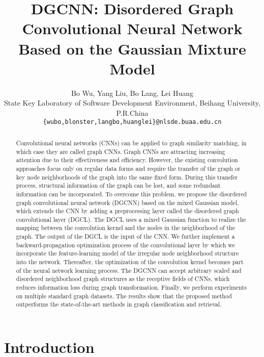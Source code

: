 \documentclass[11pt]{article}
\begin{document}
\title{DGCNN: Disordered Graph Convolutional Neural Network Based on the Gaussian Mixture Model}
\author{
Bo Wu, Yang Liu, Bo Lang, Lei Huang \\
State Key Laboratory of Software Development Environment, Beihang University, P.R.China\\
\texttt{\small\{wubo,blonster,langbo,huanglei\}@nlsde.buaa.edu.cn} \\
}
\date{}
\maketitle
\begin{abstract}
 Convolutional neural networks (CNNs) can be applied to graph similarity matching, in which case they are called graph CNNs. Graph CNNs are attracting increasing attention due to their effectiveness and efficiency. However, the existing convolution approaches focus only on regular data forms and require the transfer of the graph or key node neighborhoods of the graph into the same fixed form. During this transfer process, structural information of the graph can be lost, and some redundant information can be incorporated. To overcome this problem, we propose the disordered graph convolutional neural network (DGCNN) based on the mixed Gaussian model, which extends the CNN by adding a preprocessing layer called the disordered graph convolutional layer (DGCL). The DGCL uses a mixed Gaussian function to realize the mapping between the convolution kernel and the nodes in the neighborhood of the graph. The output of the DGCL is the input of the CNN. We further implement a backward-propagation optimization process of the convolutional layer by which we incorporate the feature-learning model of the irregular node neighborhood structure into the network. Thereafter, the optimization of the convolution kernel becomes part of the neural network learning process. The DGCNN can accept arbitrary scaled and disordered neighborhood graph structures as the receptive fields of CNNs, which reduces information loss during graph transformation. Finally, we perform experiments on multiple standard graph datasets. The results show that the proposed method outperforms the state-of-the-art methods in graph classification and retrieval.
\end{abstract}

\section{Introduction}
\end{document}
